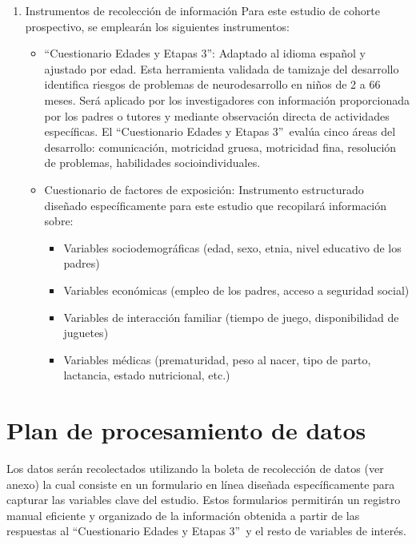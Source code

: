 \documentclass[11pt,letterpaper]{report}
\newcommand{\asq}{“Cuestionario Edades y Etapas 3”}
\begin{document}
\begin{enumerate}
\begin{enumerate}
\begin{itemize}
			sugiriendo la necesidad de intervención especializada.
			\end{itemize}
		Se analizarán las asociaciones entre los factores de exposición
		identificados y los resultados de neurodesarrollo en la evaluación.
	\end{enumerate}
	\item Instrumentos de recolección de información
	Para este estudio de cohorte prospectivo, se emplearán los siguientes
	instrumentos:
		\begin{itemize}
		\item \asq: Adaptado al idioma español y ajustado por edad. Esta
		herramienta validada de tamizaje del desarrollo identifica riesgos de
		problemas de neurodesarrollo en niños de 2 a 66 meses. Será aplicado
		por los investigadores con información proporcionada por los padres o
		tutores y mediante observación directa de actividades específicas.
		El \asq\ evalúa cinco áreas del desarrollo: comunicación, motricidad
		gruesa, motricidad fina, resolución de problemas, habilidades
		socioindividuales.

		\item Cuestionario de factores de exposición: Instrumento estructurado
		diseñado específicamente para este estudio que recopilará información
		sobre:
				\begin{itemize}
					\item Variables sociodemográficas (edad, sexo, etnia, nivel
					educativo de los padres)
					\item Variables económicas (empleo de los padres, acceso a
					seguridad social)
					\item Variables de interacción familiar (tiempo de juego,
					disponibilidad de juguetes)
					\item Variables médicas (prematuridad, peso al nacer, tipo
					de parto, lactancia, estado nutricional, etc.)
				\end{itemize}
		\end{itemize}
\end{enumerate}

\section{Plan de procesamiento de datos}
Los datos serán recolectados utilizando la boleta de recolección de datos (ver
anexo) la cual consiste en un formulario en línea diseñada específicamente para
capturar las variables clave del estudio. Estos formularios permitirán un
registro manual eficiente y organizado de la información obtenida a partir de
las respuestas al \asq\ y el resto de variables de interés.
\end{document}
